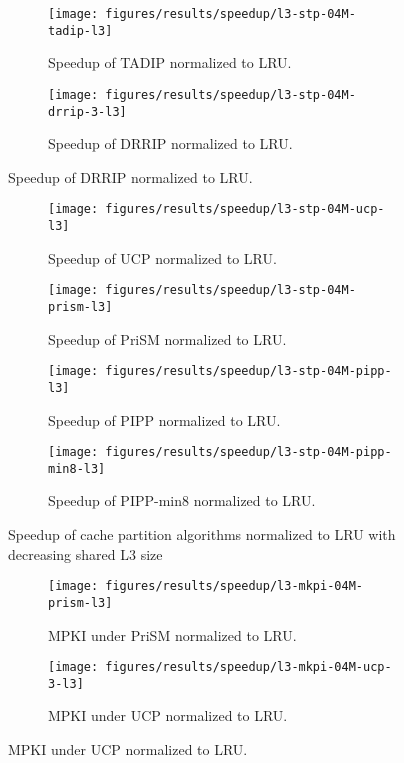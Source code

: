 \begin{figure}[!htb]
    \centering
    \begin{subfigure}[b]{0.5\textwidth}
        \texttt{[image: figures/results/speedup/l3-stp-04M-tadip-l3]}
        \caption{Speedup of TADIP normalized to LRU.}
        \label{fig:results:l3:tadip}
    \end{subfigure}%
    \begin{subfigure}[b]{0.5\textwidth}
        \texttt{[image: figures/results/speedup/l3-stp-04M-drrip-3-l3]}
        \caption{Speedup of DRRIP normalized to LRU.}
        \label{fig:results:l3:drrip}
    \end{subfigure}
\end{figure}
\clearpage
\begin{figure}[!htb]
    \ContinuedFloat
    \begin{subfigure}[b]{0.5\textwidth}
        \texttt{[image: figures/results/speedup/l3-stp-04M-ucp-l3]}
        \caption{Speedup of UCP normalized to LRU.}
        \label{fig:results:l3:ucp}
    \end{subfigure}%
    \begin{subfigure}[b]{0.5\textwidth}
        \texttt{[image: figures/results/speedup/l3-stp-04M-prism-l3]}
        \caption{Speedup of PriSM normalized to LRU.}
        \label{fig:results:l3:prism}
    \end{subfigure}
    \begin{subfigure}[b]{0.5\textwidth}
        \texttt{[image: figures/results/speedup/l3-stp-04M-pipp-l3]}
        \caption{Speedup of PIPP normalized to LRU.}
        \label{fig:results:l3:pipp}
    \end{subfigure}%
    \begin{subfigure}[b]{0.5\textwidth}
        \texttt{[image: figures/results/speedup/l3-stp-04M-pipp-min8-l3]}
        \caption{Speedup of PIPP-min8 normalized to LRU.}
        \label{fig:results:l3:pipp-min8}
    \end{subfigure}
    \caption{Speedup of cache partition algorithms normalized to LRU with decreasing shared L3 size}
    \label{fig:results:l3}
\end{figure}

\begin{figure}[!htb]
    \centering
    \begin{subfigure}[b]{0.5\textwidth}
        \texttt{[image: figures/results/speedup/l3-mkpi-04M-prism-l3]}
        \caption{MPKI under PriSM normalized to LRU.}
        \label{fig:results:l3:mpki-prism}
    \end{subfigure}%
    \begin{subfigure}[b]{0.5\textwidth}
        \texttt{[image: figures/results/speedup/l3-mkpi-04M-ucp-3-l3]}
        \caption{MPKI under UCP normalized to LRU.}
        \label{fig:results:l3:mpki-ucp}
    \end{subfigure}
\end{figure}

